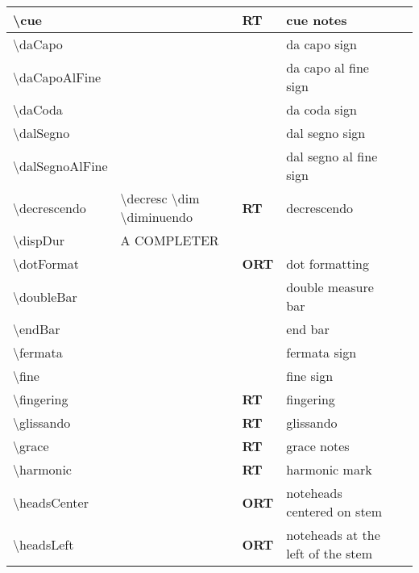 \documentclass[a4paper, landscape, 11pt]{article}
\begin{document}
\begin{tabularx}{\linewidth}{lllll}
    \textbackslash{}cue&&\textbf{RT}&cue notes&\\
    \hline
    \textbackslash{}daCapo&&&da capo sign&\\
    \hline
    \textbackslash{}daCapoAlFine&&&da capo al fine sign&\\
    \hline
    \textbackslash{}daCoda&&&da coda sign&\\
    \hline
    \textbackslash{}dalSegno&&&dal segno sign&\\
    \hline
    \textbackslash{}dalSegnoAlFine&&&dal segno al fine sign&\\
    \hline
    \textbackslash{}decrescendo&\textbackslash{}decresc \textbackslash{}dim \textbackslash{}diminuendo&\textbf{RT}&decrescendo&\\
    \hline
    \textbackslash{}dispDur&A COMPLETER&&&\\ %
    \hline
    \textbackslash{}dotFormat&&\textbf{ORT}&dot formatting&\\
    \hline
    \textbackslash{}doubleBar&&&double measure bar&\\
    \hline
    \textbackslash{}endBar&&&end bar&\\
    \hline
    \textbackslash{}fermata&&&fermata sign&\\
    \hline
    \textbackslash{}fine&&&fine sign&\\
    \hline
    \textbackslash{}fingering&&\textbf{RT}&fingering&\\
    \hline
    \textbackslash{}glissando&&\textbf{RT}&glissando&\\
    \hline
    \textbackslash{}grace&&\textbf{RT}&grace notes&\\
    \hline
    \textbackslash{}harmonic&&\textbf{RT}&harmonic mark&\\
    \hline
    \textbackslash{}headsCenter&&\textbf{ORT}&noteheads centered on stem&\\
    \hline
    \textbackslash{}headsLeft&&\textbf{ORT}&noteheads at the left of the stem&\\
    \hline
\end{tabularx}
%
%
\end{document}
